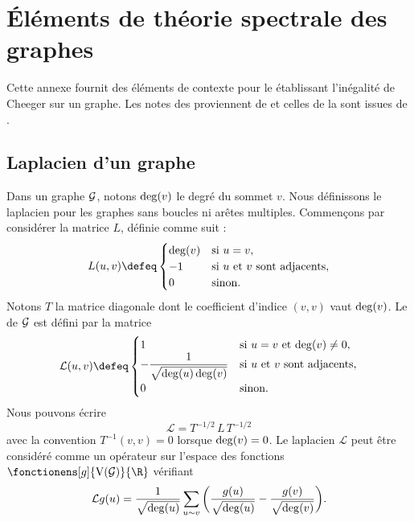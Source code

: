 \chapter{Éléments de théorie spectrale des graphes} \label{chap:graphs}

Cette annexe fournit des éléments de contexte pour le  établissant l'inégalité de Cheeger sur un graphe. Les notes des  proviennent de \cite[Sec. 1.2]{chung_lectures_1997} et celles de la  sont issues de \cite[Sec.~2]{ji_fourth_2010}.

\section{Laplacien d'un graphe} \label{sec:laplacian_of_a_graph}

Dans un graphe $\mathcal{G}$, notons $\operatorname{deg}(v)$ le degré du sommet $v$. Nous définissons le laplacien pour les graphes sans boucles ni arêtes multiples. Commençons par considérer la matrice $L$, définie comme suit :
\begin{equation}
L(u,v) \defeq \begin{cases}
    \degr(v) &\text{si } u = v, \\
    -1 &\text{si $u$ et $v$ sont adjacents}, \\
    0 & \text{sinon}.
\end{cases}
\end{equation}
Notons $T$ la matrice diagonale dont le coefficient d'indice $(v,v)$ vaut $\operatorname{deg}(v)$. Le  de $\mathcal{G}$ est défini par la matrice
\begin{equation}
\mathcal{L}(u,v) \defeq \begin{cases}
    1 & \text{si $u = v$ et $\degr(v) \not= 0$}, \\
    - \displaystyle\frac{1}{\sqrt{\degr(u) \degr(v)}} & \text{si $u$ et $v$ sont adjacents}, \\
    0 & \text{sinon}.
\end{cases}
\end{equation}
Nous pouvons écrire
\[
\mathcal{L} = T^{-1/2} \, L \, T^{-1/2}
\]
avec la convention $T^{-1}(v,v) = 0$ lorsque $\operatorname{deg}(v) = 0$. Le laplacien $\mathcal{L}$ peut être considéré comme un opérateur sur l'espace des fonctions $\fonctionens[g]{\vertices(\graphe)}{\R}$ vérifiant
\[
\mathcal{L}g(u) = \frac{1}{\sqrt{\operatorname{deg}(u)}} \sum\limits_{u \sim v} \bigg( \frac{g(u)}{\sqrt{\operatorname{deg}(u)}} - \frac{g(v)}{\sqrt{\operatorname{deg}(v)}} \bigg).
\]

